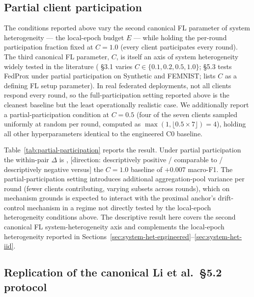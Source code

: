 \subsection{Partial client participation}
\label{sec:partial-participation}

The conditions reported above vary the second canonical FL parameter
of system heterogeneity --- the local-epoch budget $E$ --- while
holding the per-round participation fraction fixed at $C = 1.0$ (every
client participates every round). The third canonical FL parameter,
$C$, is itself an axis of system heterogeneity widely tested in the
literature (\citealt{mcmahan2017fedavg} §3.1 varies
$C \in \{0.1, 0.2, 0.5, 1.0\}$; \citealt{li2020fedprox} §5.3 tests
FedProx under partial participation on Synthetic and FEMNIST;
\citealt{kairouz2021advances} lists $C$ as a defining FL setup
parameter). In real federated deployments, not all clients respond
every round, so the full-participation setting reported above is the
cleanest baseline but the least operationally realistic case. We
additionally report a partial-participation condition at $C = 0.5$
(four of the seven clients sampled uniformly at random per round,
computed as $\max(1, \lfloor 0.5 \times 7 \rfloor) = 4$), holding all
other hyperparameters identical to the engineered C0 baseline.

Table~\ref{tab:partial-participation} reports the result. Under
partial participation the within-pair $\Delta$ is
, [direction: descriptively positive / comparable to /
descriptively negative versus] the $C = 1.0$ baseline of $+0.007$
macro-F1. The partial-participation setting introduces additional
aggregation-pool variance per round (fewer clients contributing,
varying subsets across rounds), which on mechanism grounds is
expected to interact with the proximal anchor's drift-control
mechanism in a regime not directly tested by the local-epoch
heterogeneity conditions above. The descriptive result here covers
the second canonical FL system-heterogeneity axis and complements the
local-epoch heterogeneity reported in
Sections~\ref{sec:system-het-engineered}--\ref{sec:system-het-iid}.



\subsection{Replication of the canonical Li et al.\ §5.2 protocol}
\label{sec:asymmetric}

